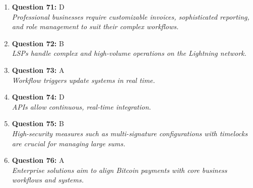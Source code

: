 \documentclass[12pt,a4paper]{article}
\begin{document}
\begin{enumerate}
\item \textbf{Question 71:} D
\\ \textit{Professional businesses require customizable invoices, sophisticated reporting, and role management to suit their complex workflows.}

\item \textbf{Question 72:} B
\\ \textit{LSPs handle complex and high-volume operations on the Lightning network.}

\item \textbf{Question 73:} A
\\ \textit{Workflow triggers update systems in real time.}

\item \textbf{Question 74:} D
\\ \textit{APIs allow continuous, real-time integration.}

\item \textbf{Question 75:} B
\\ \textit{High-security measures such as multi-signature configurations with timelocks are crucial for managing large sums.}

\item \textbf{Question 76:} A
\\ \textit{Enterprise solutions aim to align Bitcoin payments with core business workflows and systems.}


\end{enumerate}
\end{document}
